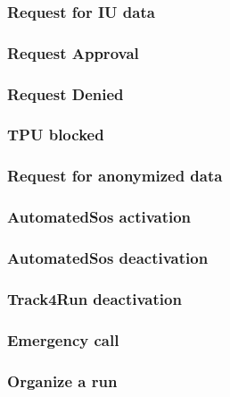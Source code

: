 \subsubsection{Request for IU data}

\clearpage
\subsubsection{Request Approval}

\clearpage
\subsubsection{Request Denied}

\clearpage
\subsubsection{TPU blocked}

\clearpage
\subsubsection{Request for anonymized data} 

\clearpage
\subsubsection{AutomatedSos activation}

\clearpage
\subsubsection{AutomatedSos deactivation}

\clearpage
\subsubsection{Track4Run deactivation}

\clearpage
\subsubsection{Emergency call}

\clearpage
\subsubsection{Organize a run}

\clearpage
